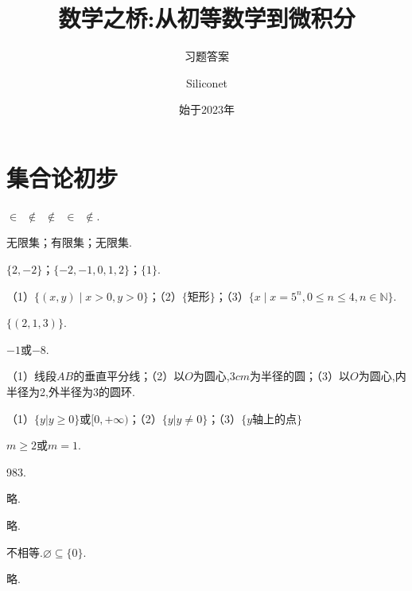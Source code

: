 \documentclass[lang=cn,newtx,10pt,scheme=chinese]{elegantbook}
\title{数学之桥:从初等数学到微积分}
\subtitle{习题答案}
\author{Siliconet}
\date{始于2023年}
\begin{document}
\maketitle
\frontmatter

\tableofcontents

\mainmatter

\chapter{集合论初步}
\begin{exercise}
  $\in\enspace\notin\enspace\notin\enspace\in\enspace\notin$.
\end{exercise}
\begin{exercise}
  无限集；有限集；无限集.
\end{exercise}
\begin{exercise}
  $\{2,-2\}$；$\{-2,-1,0,1,2\}$；$\{1\}$.
\end{exercise}
\begin{exercise}
  （1）$\{(x,y)\mid x>0,y>0\}$；（2）$\{\text{矩形}\}$；（3）$\{x\mid x=5^n,0\leq n\leq 4,n\in\mathbb{N}\}$.
\end{exercise}
\begin{exercise}
  $\{(2,1,3)\}$.
\end{exercise}
\begin{exercise}
  $-1$或$-8$.
\end{exercise}
\begin{exercise}
  （1）线段$AB$的垂直平分线；（2）以$O$为圆心,$3cm$为半径的圆；（3）以$O$为圆心,内半径为2,外半径为3的圆环.
\end{exercise}
\begin{exercise}
  （1）$\{y|y\geqslant0\}$或$[0,+\infty)$；（2）$\{y|y\neq0\}$；（3）$\{y\text{轴上的点}\}$
\end{exercise}
\begin{exercise}
  $m\geqslant2\text{或}m=1$.
\end{exercise}
\begin{exercise}
  983.
\end{exercise}
\begin{exercise}
  略.
\end{exercise}
\begin{exercise}
  略.
\end{exercise}
\begin{exercise}
  不相等.$\varnothing\subseteq\{0\}.$
\end{exercise}
\begin{exercise}
  略.
\end{exercise}
\end{document}
